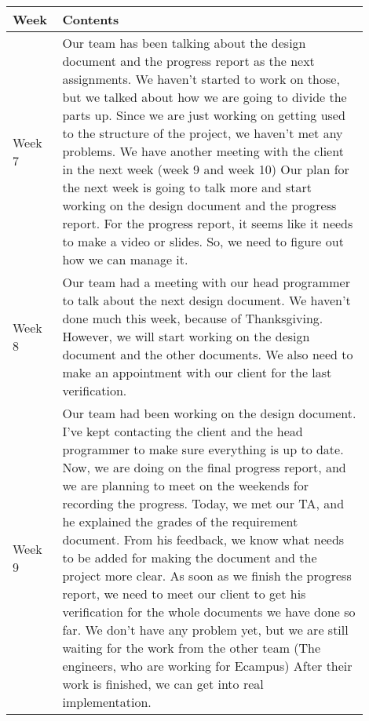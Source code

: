 \documentclass[10pt]{article}
\begin{document}
\begin{center}
            \begin{tabular}{ | p{0.1\linewidth} | p{0.8\linewidth} | } \hline
                Week & Contents  \\ \hline
                Week 7 & Our team has been talking about the design document and the progress report as the next assignments. We haven't started to work on those, but we talked about how we are going to divide the parts up.
                Since we are just working on getting used to the structure of the project, we haven't met any problems.
                We have another meeting with the client in the next week (week 9 and week 10)
                Our plan for the next week is going to talk more and start working on the design document and the progress report.
                For the progress report, it seems like it needs to make a video or slides. So, we need to figure out how we can manage it.  \\ \hline
                Week 8 &  Our team had a meeting with our head programmer to talk about the next design document. We haven't done much this week, because of Thanksgiving.
                However, we will start working on the design document and the other documents.
                We also need to make an appointment with our client for the last verification. \\ \hline
                Week 9 & Our team had been working on the design document.
                I've kept contacting the client and the head programmer to make sure everything is up to date.
                Now, we are doing on the final progress report, and we are planning to meet on the weekends for recording the progress.
                Today, we met our TA, and he explained the grades of the requirement document.
                From his feedback, we know what needs to be added for making the document and the project more clear.
                As soon as we finish the progress report, we need to meet our client to get his verification for the whole documents we have done so far.
                We don't have any problem yet, but we are still waiting for the work from the other team (The engineers, who are working for Ecampus)
                After their work is finished, we can get into real implementation.  \\ \hline
            \end{tabular}
            \end{center}
\end{document}
